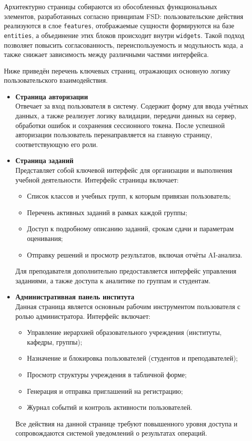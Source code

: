 Архитектурно страницы собираются из обособленных функциональных элементов, разработанных согласно принципам FSD: пользовательские действия реализуются в слое \texttt{features}, отображаемые сущности формируются на базе \texttt{entities}, а объединение этих блоков происходит внутри \texttt{widgets}. Такой подход позволяет повысить согласованность, переиспользуемость и модульность кода, а также снижает зависимость между различными частями интерфейса.

Ниже приведён перечень ключевых страниц, отражающих основную логику пользовательского взаимодействия.

\begin{itemize}
  \item \textbf{Страница авторизации}\\  
  Отвечает за вход пользователя в систему. Содержит форму для ввода учётных данных, а также реализует логику валидации, передачи данных на сервер, обработки ошибок и сохранения сессионного токена. После успешной авторизации пользователь перенаправляется на главную страницу, соответствующую его роли.

  \item \textbf{Страница заданий}\\
  Представляет собой ключевой интерфейс для организации и выполнения учебной деятельности. Интерфейс страницы включает:
  \begin{itemize}
    \item Список классов и учебных групп, к которым привязан пользователь;
    \item Перечень активных заданий в рамках каждой группы;
    \item Доступ к подробному описанию заданий, срокам сдачи и параметрам оценивания;
    \item Отправку решений и просмотр результатов, включая отчёты AI-анализа.
  \end{itemize}
  Для преподавателя дополнительно предоставляется интерфейс управления заданиями, а также доступа к аналитике по группам и студентам.

  \item \textbf{Административная панель института}\\
  Данная страница является основным рабочим инструментом пользователя с ролью администратора. Интерфейс включает:
  \begin{itemize}
    \item Управление иерархией образовательного учреждения (институты, кафедры, группы);
    \item Назначение и блокировка пользователей (студентов и преподавателей);
    \item Просмотр структуры учреждения в табличной форме;
    \item Генерация и отправка приглашений на регистрацию;
    \item Журнал событий и контроль активности пользователей.
  \end{itemize}
  Все действия на данной странице требуют повышенного уровня доступа и сопровождаются системой уведомлений о результатах операций.


\end{itemize}
